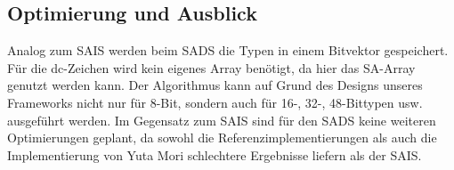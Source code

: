 \subsection{Optimierung und Ausblick}
Analog zum SAIS werden beim SADS die Typen in einem Bitvektor gespeichert. Für die dc-Zeichen wird kein eigenes Array benötigt, da hier das SA-Array genutzt werden kann. Der Algorithmus kann auf Grund des Designs unseres Frameworks nicht nur für 8-Bit, sondern auch für 16-, 32-, 48-Bittypen usw. ausgeführt werden. Im Gegensatz zum SAIS sind für den SADS keine weiteren Optimierungen geplant, da sowohl die Referenzimplementierungen als auch die Implementierung von Yuta Mori schlechtere Ergebnisse liefern als der SAIS.
 \newpage





























